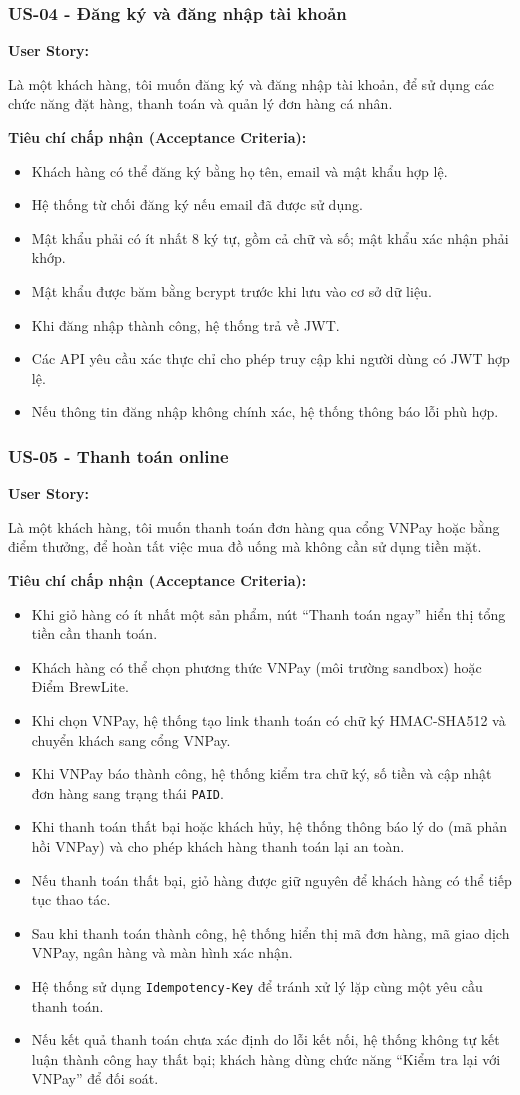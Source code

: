 \documentclass[12pt,a4paper]{article}
\newcommand{\userstory}[2]{%
  \noindent\textbf{User Story:}\par
  #1\par
  \hspace*{\parindent}\textbf{Tiêu chí chấp nhận (Acceptance Criteria):}
  \begin{itemize}
    #2
  \end{itemize}}
\begin{document}
\subsubsection{US-04 - Đăng ký và đăng nhập tài khoản}
\userstory{Là một khách hàng, tôi muốn đăng ký và đăng nhập tài khoản, để sử dụng các chức năng đặt hàng, thanh toán và quản lý đơn hàng cá nhân.}{
  \item Khách hàng có thể đăng ký bằng họ tên, email và mật khẩu hợp lệ.
  \item Hệ thống từ chối đăng ký nếu email đã được sử dụng.
  \item Mật khẩu phải có ít nhất 8 ký tự, gồm cả chữ và số; mật khẩu xác nhận phải khớp.
  \item Mật khẩu được băm bằng bcrypt trước khi lưu vào cơ sở dữ liệu.
  \item Khi đăng nhập thành công, hệ thống trả về JWT.
  \item Các API yêu cầu xác thực chỉ cho phép truy cập khi người dùng có JWT hợp lệ.
  \item Nếu thông tin đăng nhập không chính xác, hệ thống thông báo lỗi phù hợp.
}

\subsubsection{US-05 - Thanh toán online}
\userstory{Là một khách hàng, tôi muốn thanh toán đơn hàng qua cổng VNPay hoặc bằng điểm thưởng, để hoàn tất việc mua đồ uống mà không cần sử dụng tiền mặt.}{
  \item Khi giỏ hàng có ít nhất một sản phẩm, nút ``Thanh toán ngay'' hiển thị tổng tiền cần thanh toán.
  \item Khách hàng có thể chọn phương thức VNPay (môi trường sandbox) hoặc Điểm BrewLite.
  \item Khi chọn VNPay, hệ thống tạo link thanh toán có chữ ký HMAC-SHA512 và chuyển khách sang cổng VNPay.
  \item Khi VNPay báo thành công, hệ thống kiểm tra chữ ký, số tiền và cập nhật đơn hàng sang trạng thái \texttt{PAID}.
  \item Khi thanh toán thất bại hoặc khách hủy, hệ thống thông báo lý do (mã phản hồi VNPay) và cho phép khách hàng thanh toán lại an toàn.
  \item Nếu thanh toán thất bại, giỏ hàng được giữ nguyên để khách hàng có thể tiếp tục thao tác.
  \item Sau khi thanh toán thành công, hệ thống hiển thị mã đơn hàng, mã giao dịch VNPay, ngân hàng và màn hình xác nhận.
  \item Hệ thống sử dụng \texttt{Idempotency-Key} để tránh xử lý lặp cùng một yêu cầu thanh toán.
  \item Nếu kết quả thanh toán chưa xác định do lỗi kết nối, hệ thống không tự kết luận thành công hay thất bại; khách hàng dùng chức năng ``Kiểm tra lại với VNPay'' để đối soát.
}
\end{document}
